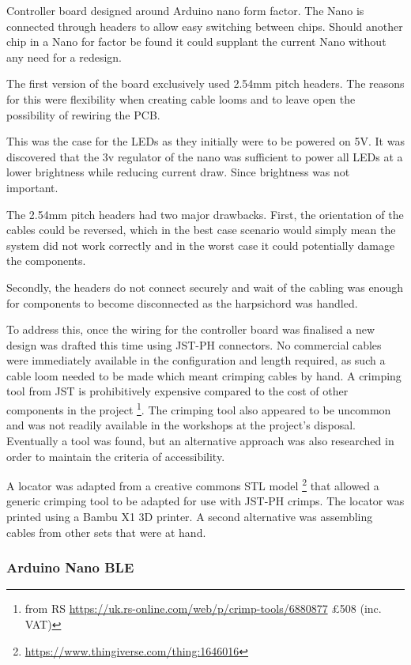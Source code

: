 Controller board designed around Arduino nano form factor. The Nano is
connected through headers to allow easy switching between chips. Should
another chip in a Nano for factor be found it could supplant the current
Nano without any need for a redesign.

The first version of the board exclusively used 2.54mm pitch headers.
The reasons for this were flexibility when creating cable looms and to
leave open the possibility of rewiring the PCB.

This was the case for the LEDs as they initially were to be powered on
5V. It was discovered that the 3v regulator of the nano was sufficient
to power all LEDs at a lower brightness while reducing current draw.
Since brightness was not important.

The 2.54mm pitch headers had two major drawbacks. First, the orientation
of the cables could be reversed, which in the best case scenario would
simply mean the system did not work correctly and in the worst case it
could potentially damage the components.

Secondly, the headers do not connect securely and wait of the cabling
was enough for components to become disconnected as the harpsichord was
handled.

To address this, once the wiring for the controller board was finalised
a new design was drafted this time using JST-PH connectors. No
commercial cables were immediately available in the configuration and
length required, as such a cable loom needed to be made which meant
crimping cables by hand. A crimping tool from JST is prohibitively
expensive compared to the cost of other components in the project
\footnote{from RS \url{https://uk.rs-online.com/web/p/crimp-tools/6880877}
£508 (inc. VAT)}. The crimping tool also appeared to be uncommon and was
not readily available in the workshops at the project's disposal.
Eventually a tool was found, but an alternative approach was also
researched in order to maintain the criteria of accessibility.

A locator was adapted from a creative commons STL model
\footnote{\url{https://www.thingiverse.com/thing:1646016}} that allowed a
generic crimping tool to be adapted for use with JST-PH crimps. 
The locator was printed using a Bambu X1 3D printer. 
A second alternative was assembling cables from other sets that were at hand.

\subsubsection{Arduino Nano BLE}\label{arduino-nano-ble}

